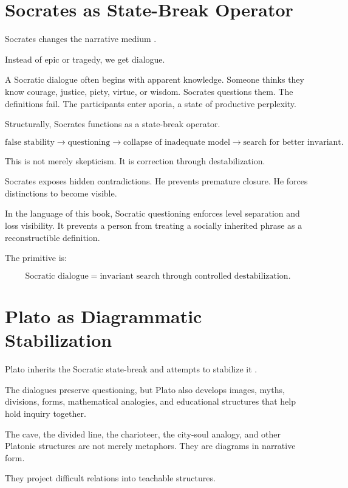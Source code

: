 \documentclass[11pt]{book}
\begin{document}
\section{Socrates as State-Break Operator}

Socrates changes the narrative medium \cite{PlatoCooper1997CompleteWorks}.

Instead of epic or tragedy, we get dialogue.

A Socratic dialogue often begins with apparent knowledge. Someone thinks they know courage, justice, piety, virtue, or wisdom. Socrates questions them. The definitions fail. The participants enter aporia, a state of productive perplexity.

Structurally, Socrates functions as a state-break operator.

\[
\text{false stability}
\rightarrow
\text{questioning}
\rightarrow
\text{collapse of inadequate model}
\rightarrow
\text{search for better invariant}.
\]

This is not merely skepticism. It is correction through destabilization.

Socrates exposes hidden contradictions. He prevents premature closure. He forces distinctions to become visible.

In the language of this book, Socratic questioning enforces level separation and loss visibility. It prevents a person from treating a socially inherited phrase as a reconstructible definition.

The primitive is:

\[
\text{Socratic dialogue} = \text{invariant search through controlled destabilization}.
\]

\section{Plato as Diagrammatic Stabilization}

Plato inherits the Socratic state-break and attempts to stabilize it \cite{PlatoCooper1997CompleteWorks}.

The dialogues preserve questioning, but Plato also develops images, myths, divisions, forms, mathematical analogies, and educational structures that help hold inquiry together.

The cave, the divided line, the charioteer, the city-soul analogy, and other Platonic structures are not merely metaphors. They are diagrams in narrative form.

They project difficult relations into teachable structures.
\end{document}
